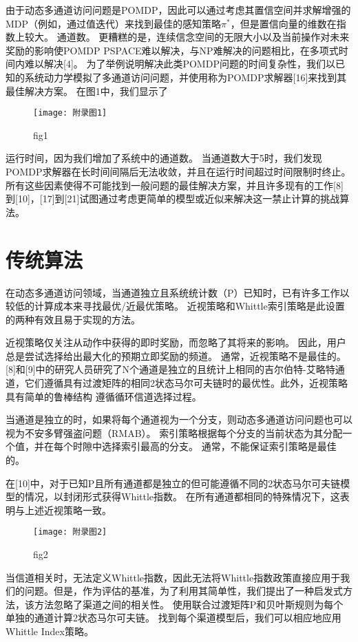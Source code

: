 由于动态多通道访问问题是POMDP，因此可以通过考虑其置信空间并求解增强的MDP（例如，通过值迭代）来找到最佳的感知策略$\pi^{*}$，但是置信向量的维数在指数上较大。 通道数。 更糟糕的是，连续信念空间的无限大小以及当前操作对未来奖励的影响使POMDP PSPACE难以解决，与NP难解决的问题相比，在多项式时间内难以解决[4]。 为了举例说明解决此类POMDP问题的时间复杂性，我们以已知的系统动力学模拟了多通道访问问题，并使用称为POMDP求解器[16]来找到其最佳解决方案。 在图1中，我们显示了
\begin{figure}[h]
	\centering
	\texttt{[image: 附录图1]}
	\caption{fig1}
\end{figure}

运行时间，因为我们增加了系统中的通道数。 当通道数大于5时，我们发现POMDP求解器在长时间间隔后无法收敛，并且在运行时间超过时间限制时终止。 所有这些因素使得不可能找到一般问题的最佳解决方案，并且许多现有的工作[8]到[10]，[17]到[21]试图通过考虑更简单的模型或近似来解决这一禁止计算的挑战算法。

\section{ 传统算法  }
在动态多通道访问领域，当通道独立且系统统计数（P）已知时，已有许多工作以较低的计算成本来寻找最优/近最优策略。 近视策略和Whittle索引策略是此设置的两种有效且易于实现的方法。

近视策略仅关注从动作中获得的即时奖励，而忽略了其将来的影响。 因此，用户总是尝试选择给出最大化的预期立即奖励的频道。 通常，近视策略不是最佳的。 [8]和[9]中的研究人员研究了N个通道是独立的且统计上相同的吉尔伯特-艾略特通道，它们遵循具有过渡矩阵的相同2状态马尔可夫链时的最优性。此外，近视策略具有简单的鲁棒结构 遵循循环信道选择过程。

当通道是独立的时，如果将每个通道视为一个分支，则动态多通道访问问题也可以视为不安多臂强盗问题（RMAB）。 索引策略根据每个分支的当前状态为其分配一个值，并在每个时隙中选择索引最高的分支。 通常，不能保证索引策略是最佳的。

在[10]中，对于已知P且所有通道都是独立的但可能遵循不同的2状态马尔可夫链模型的情况，以封闭形式获得Whittle指数。 在所有通道都相同的特殊情况下，这表明与上述近视策略一致。
\begin{figure}[h]
	\centering
	\texttt{[image: 附录图2]}
	\caption{fig2}
\end{figure}
当信道相关时，无法定义Whittle指数，因此无法将Whittle指数政策直接应用于我们的问题。但是，作为评估的基准，为了利用其简单性，我们提出了一种启发式方法，该方法忽略了渠道之间的相关性。 使用联合过渡矩阵P和贝叶斯规则为每个单独的通道计算2状态马尔可夫链。 找到每个渠道模型后，我们可以相应地应用Whittle Index策略。

